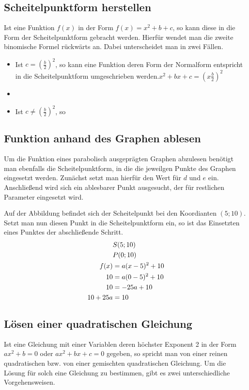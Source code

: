 \subsection{Scheitelpunktform herstellen}\label{sec:Quadratische Funktionen/Scheitelpunktform herstellen}
Ist eine Funktion $f(x)$ in der Form $f(x)=x^2+b+c$, so kann diese in die Form der Scheitelpunktform gebracht werden. Hierfür wendet man die zweite binomische Formel rückwärts an. Dabei unterscheidet man in zwei Fällen.  
\begin{itemize}
	\item Ist $c=\left(\frac{b}{2}\right)^2$, so kann eine Funktion deren Form der Normalform entspricht in die Scheitelpunktform umgeschrieben werden.$x^2+bx+c=\left(x\frac{b}{2}\right)^2$
	\item 
	\item Ist $c\neq\left(\frac{b}{2}\right)^2$, so
\end{itemize}
\subsection{Funktion anhand des Graphen ablesen}\label{sec:Quadratische Funktionen/Funktion anhand des Graphen ablesen}
Um die Funktion eines parabolisch ausgeprägten Graphen abzulesen benötigt man ebenfalls die Scheitelpunktform, in die die jeweilgen Punkte des Graphen eingesetzt werden. Zunächst setzt man hierfür den Wert für $d$ und $e$ ein. Anschließend wird sich ein ablesbarer Punkt ausgesucht, der für restlichen Parameter eingesetzt wird. 

\begin{beispiel}
	Auf der Abbildung befindet sich der Scheitelpunkt bei den Koordianten $(5;10)$. Setzt man nun diesen Punkt in die Scheitelpunktform ein, so ist das Einsetzten eines Punktes der abschließende Schritt.
	\begin{align}
	\setcounter{equation}{0}
		&S(5;10)\\
		&P(0;10)\\
		f(x)&=a(x-5)^2+10\\
		10&=a(0-5)^2+10\\
		10&=-25a+10\\
		10+25a&=10
	\end{align}
\end{beispiel}
\subsection{Lösen einer quadratischen Gleichung}\label{sec:Quadratische Funktionen/Loesen einer quadratischen Gleichung}
Ist eine Gleichung mit einer Variablen deren höchster Exponent 2 in der Form $ax^2+b=0$ oder $ax^2+bx+c=0$ gegeben, so spricht man von einer reinen quadratischen bzw. von einer gemischten quadratischen Gleichung. Um die Lösung für solch eine Gleichung zu bestimmen, gibt es zwei unterschiedliche Vorgehensweisen.
